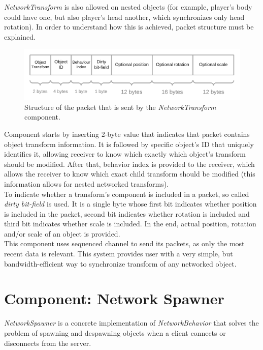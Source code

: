 \documentclass[times, utf8, diplomski]{fer}
\begin{document}
\textit{NetworkTransform} is also allowed on nested objects (for example, player's body could have one, but also player's head another, which synchronizes only head rotation). In order to understand how this is achieved, packet structure must be explained.

\begin{figure}[H]
	\centering
	\includegraphics[scale=0.25]{NetworkTransform-packet-structure}
	\caption{Structure of the packet that is sent by the \textit{NetworkTransform} component.}
\end{figure}

Component starts by inserting 2-byte value that indicates that packet contains object transform information. It is followed by specific object's ID that uniquely identifies it, allowing receiver to know which exactly which object's transform should be modified. After that, behavior index is provided to the receiver, which allows the receiver to know which exact child transform should be modified (this information allows for nested networked transforms).\\

To indicate whether a transform's component is included in a packet, so called \textit{dirty bit-field} is used. It is a single byte whose first bit indicates whether position is included in the packet, second bit indicates whether rotation is included and third bit indicates whether scale is included. In the end, actual position, rotation and/or scale of an object is provided.\\

This component uses sequenced channel to send its packets, as only the most recent data is relevant. This system provides user with a very simple, but bandwidth-efficient way to synchronize transform of any networked object. 

\section{Component: Network Spawner}
\textit{NetworkSpawner} is a concrete implementation of \textit{NetworkBehavior} that solves the problem of spawning and despawning objects when a client connects or disconnects from the server.
\end{document}
